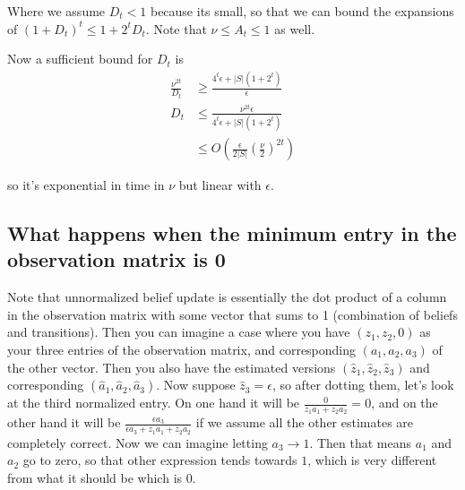 \documentclass[10pt,english]{article}
\begin{document}
Where we assume $D_t<1$ because its small, so that we can bound the expansions of $(1+D_t)^t\leq 1+2^tD_t$. Note that $\nu \leq A_t \leq 1$ as well.

Now a sufficient bound for $D_t$ is
\begin{align}
\frac{\nu^{2t}}{D_t} &\geq \frac{4^t\epsilon + |S|(1+2^t)}{\epsilon} \\
D_t &\leq \frac{\nu^{2t}\epsilon}{4^t\epsilon+|S|(1+2^t)} \\
&\leq O\left( \frac{\epsilon}{2|S|}\left(\frac{\nu}{2}\right)^{2t} \right)
\end{align}

so it's exponential in time in $\nu$ but linear with $\epsilon$.

\subsection{What happens when the minimum entry in the observation matrix is 0}

Note that unnormalized belief update is essentially the dot product of a column in the observation matrix with some vector that sums to 1 (combination of beliefs and transitions). Then you can imagine a case where you have $(z_1, z_2, 0)$ as your three entries of the observation matrix, and corresponding $(a_1,a_2,a_3)$ of the other vector. Then you also have the estimated versions $(\widehat{z}_1,\widehat{z}_2,\widehat{z}_3)$ and corresponding $(\widehat{a}_1,\widehat{a}_2,\widehat{a}_3)$. Now suppose $\widehat{z}_3=\epsilon$, so after dotting them, let's look at the third normalized entry. On one hand it will be $\frac{0}{z_1a_1+z_2a_2}=0$, and on the other hand it will be $\frac{\epsilon a_3}{\epsilon a_3+z_1a_1+z_2a_2}$ if we assume all the other estimates are completely correct. Now we can imagine letting $a_3\rightarrow 1$. Then that means $a_1$ and $a_2$ go to zero, so that other expression tends towards $1$, which is very different from what it should be which is $0$.
\end{document}
